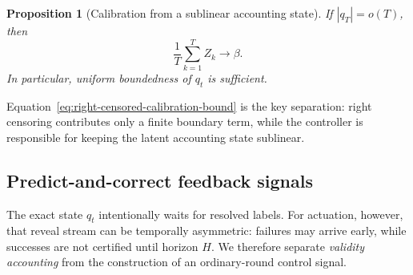 \documentclass[11pt]{article}
\newtheorem{proposition}{Proposition}
\begin{document}
\begin{proposition}[Calibration from a sublinear accounting state]
If $|q_T|=o(T)$, then
\[
    \frac1T\sum_{k=1}^T Z_k\longrightarrow\beta.
\]
In particular, uniform boundedness of $q_t$ is sufficient.
\end{proposition}

Equation~\eqref{eq:right-censored-calibration-bound} is the key separation:
right censoring contributes only a finite boundary term, while the controller is
responsible for keeping the latent accounting state sublinear.

\subsection{Predict-and-correct feedback signals}
\label{sec:first-failure-predict-correct}

The exact state $q_t$ intentionally waits for resolved labels.  For actuation,
however, that reveal stream can be temporally asymmetric: failures may arrive
early, while successes are not certified until horizon $H$.  We therefore
separate \emph{validity accounting} from the construction of an ordinary-round
control signal.
\end{document}
